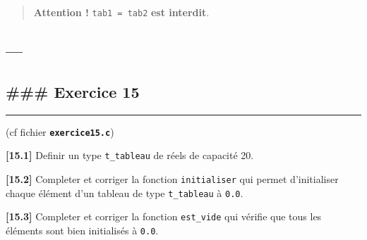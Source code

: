 \documentclass[11pt]{article}
\begin{document}
\begin{quote}
\textbf{Attention !} \texttt{tab1\ =\ tab2} \textbf{est interdit}.
\end{quote}

    \hypertarget{section}{%
\subsection{---}\label{section}}

\hypertarget{exercice-15}{%
\subsection{\#\#\# Exercice 15}\label{exercice-15}}

\begin{center}\rule{0.5\linewidth}{0.5pt}\end{center}

(cf fichier \textbf{\texttt{exercice15.c}})

\textbf{{[}15.1{]}} Definir un type \texttt{t\_tableau} de réels de
capacité 20.

\textbf{{[}15.2{]}} Completer et corriger la fonction
\texttt{initialiser} qui permet d'initialiser chaque élément d'un
tableau de type \texttt{t\_tableau} à \texttt{0.0}.

\textbf{{[}15.3{]}} Completer et corriger la fonction \texttt{est\_vide}
qui vérifie que tous les éléments sont bien initialisés à \texttt{0.0}.
\end{document}
